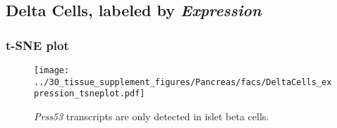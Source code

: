 \clearpage

\subsection{Delta Cells, labeled by \emph{Expression}}

\clearpage
\subsubsection{t-SNE plot}
\begin{figure}[h]
\centering
\texttt{[image: ../30\_tissue\_supplement\_figures/Pancreas/facs/DeltaCells\_expression\_tsneplot.pdf]}

\caption{\emph{Prss53} transcripts are only detected in islet beta cells.
}
\end{figure}

